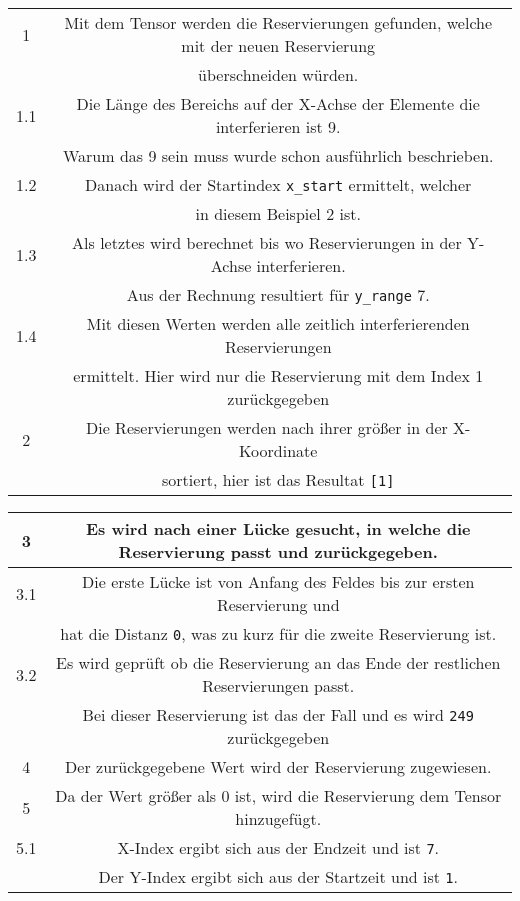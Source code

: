 \begin{table}[H]
    \centering
    \begin{tabular}{|c|c|}
        \hline
        1 & Mit dem Tensor werden die Reservierungen gefunden, welche mit der neuen Reservierung \\& überschneiden würden.\\ \hline
        1.1 & Die Länge des Bereichs auf der X-Achse der Elemente die interferieren ist 9. \\& Warum das 9 sein muss wurde schon ausführlich beschrieben. \\ \hline
        1.2 & Danach wird der Startindex \texttt{x\_start} ermittelt, welcher \\& in diesem Beispiel 2 ist. \\ \hline
        1.3 & Als letztes wird berechnet bis wo Reservierungen in der Y-Achse interferieren. \\&Aus der Rechnung resultiert für \texttt{y\_range} 7. \\ \hline
        1.4 & Mit diesen Werten werden alle zeitlich interferierenden Reservierungen \\& ermittelt. Hier wird nur die Reservierung mit dem Index 1 zurückgegeben \\ \hline
        2 & Die Reservierungen werden nach ihrer größer in der X-Koordinate \\& sortiert, hier ist das Resultat \texttt{[1]}\\ \hline
    \end{tabular}
\end{table}
\begin{table}[H]
    \centering
    \begin{tabular}{|c|c|}
        \hline
        3 & Es wird nach einer Lücke gesucht, in welche die Reservierung passt und zurückgegeben. \\ \hline
        3.1 & Die erste Lücke ist von Anfang des Feldes bis zur ersten Reservierung und \\& hat die Distanz \texttt{0}, was zu kurz für die zweite Reservierung ist. \\ \hline
        3.2 & Es wird geprüft ob die Reservierung an das Ende der restlichen Reservierungen passt. \\& Bei dieser Reservierung ist das der Fall und es wird \texttt{249} zurückgegeben\\ \hline
        4 & Der zurückgegebene Wert wird der Reservierung zugewiesen. \\ \hline
        5 & Da der Wert größer als 0 ist, wird die Reservierung dem Tensor hinzugefügt. \\ \hline
        5.1 & X-Index ergibt sich aus der Endzeit und ist \texttt{7}. \\& Der Y-Index ergibt sich aus der Startzeit und ist \texttt{1}. \\ \hline
    \end{tabular}
\end{table}

